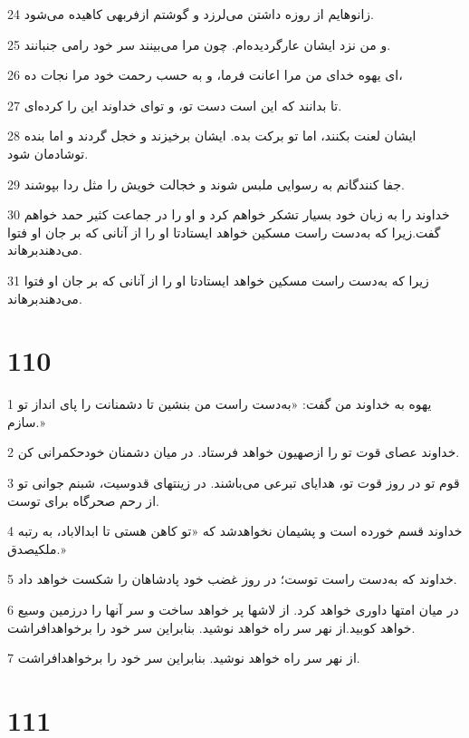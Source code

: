 \par 24 زانوهایم از روزه داشتن می‌لرزد و گوشتم ازفربهی کاهیده می‌شود.
\par 25 و من نزد ایشان عارگردیده‌ام. چون مرا می‌بینند سر خود رامی جنبانند.
\par 26 ‌ای یهوه خدای من مرا اعانت فرما، و به حسب رحمت خود مرا نجات ده،
\par 27 تا بدانند که این است دست تو، و تو‌ای خداوند این را کرده‌ای.
\par 28 ایشان لعنت بکنند، اما تو برکت بده. ایشان برخیزند و خجل گردند و اما بنده توشادمان شود.
\par 29 جفا کنندگانم به رسوایی ملبس شوند و خجالت خویش را مثل ردا بپوشند.
\par 30 خداوند را به زبان خود بسیار تشکر خواهم کرد و او را در جماعت کثیر حمد خواهم گفت.زیرا که به‌دست راست مسکین خواهد ایستادتا او را از آنانی که بر جان او فتوا می‌دهندبرهاند.
\par 31 زیرا که به‌دست راست مسکین خواهد ایستادتا او را از آنانی که بر جان او فتوا می‌دهندبرهاند.
 
\chapter{110}

\par 1 یهوه به خداوند من گفت: «به‌دست راست من بنشین تا دشمنانت را پای انداز تو سازم.»
\par 2 خداوند عصای قوت تو را ازصهیون خواهد فرستاد. در میان دشمنان خودحکمرانی کن.
\par 3 قوم تو در روز قوت تو، هدایای تبرعی می‌باشند. در زینتهای قدوسیت، شبنم جوانی تو از رحم صحرگاه برای توست.
\par 4 خداوند قسم خورده است و پشیمان نخواهدشد که «تو کاهن هستی تا ابدالاباد، به رتبه ملکیصدق.»
\par 5 خداوند که به‌دست راست توست؛ در روز غضب خود پادشاهان را شکست خواهد داد.
\par 6 در میان امتها داوری خواهد کرد. از لاشها پر خواهد ساخت و سر آنها را درزمین وسیع خواهد کوبید.از نهر سر راه خواهد نوشید. بنابراین سر خود را بر‌خواهدافراشت.
\par 7 از نهر سر راه خواهد نوشید. بنابراین سر خود را بر‌خواهدافراشت.
 
\chapter{111}

